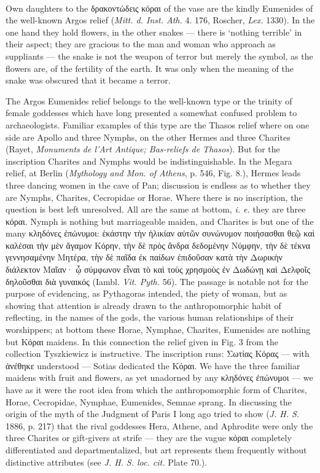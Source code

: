 \documentclass[a4paper, 11pt, oneside, polutonikogreek, english]{article}
\begin{document}
\paragraph{}
Own daughters to the δρακοντώδεις κόραι of the vase are the kindly Eumenides of the well-known Argos relief (\emph{Mitt. d. Inst. Ath.} 4. 176, Roscher, \emph{Lex.} 1330). In the one hand they hold flowers, in the other snakes --- there is `nothing terrible' in their aspect; they are gracious to the man and woman who approach as suppliants --- the snake is not the weapon of terror but merely the symbol, as the flowers are, of the fertility of the earth. It was only when the meaning of the snake was obscured that it became a terror.

The Argos Eumenides relief belongs to the well-known type or the trinity of female goddesses which have long presented a somewhat confused problem to archaeologists. Familiar examples of this type are the Thasos relief where on one side are Apollo and three Nymphs, on the other Hermes and three Charites (Rayet, \emph{Monuments de l'Art Antique; Bas-reliefs de Thasos}). But for the inscription Charites and Nymphs would be indistinguishable. In the Megara relief, at Berlin (\emph{Mythology and Mon. of Athens}, p. 546, Fig. 8.), Hermes leads three dancing women in the cave of Pan; discussion is endless as to whether they are Nymphs, Charites, Cecropidae or Horae. Where there is no inscription, the question is best left unresolved. All are the same at bottom, \emph{i. e.} they are three κόραι. Nymph is nothing but marriageable maiden, and Charites is but one of the many κληδόνες ἐπώνυμοι: ἑκάστην τὴν ἡλικίαν αὐτῶν συνώνυμον ποιήσασθαι θεῷ καὶ καλέσαι τὴν μὲν ἄγαμον Κόρην, τὴν δὲ πρὸς ἄνδρα δεδομένην Νύμφην, τὴν δὲ τέκνα γεννησαμένην Μητέρα, τὴν δὲ παῖδα ἐκ παίδων ἐπιδοῦσαν κατὰ τὴν Δωρικὴν διάλεκτον Μαῖαν· ᾧ σύμφωνον εἶναι τὸ καὶ τοὺς χρησμοὺς ἐν Δωδώνῃ καὶ Δελφοῖς δηλοῦσθαι διὰ γυναικός (Iambl. \emph{Vit. Pyth.} 56). The passage is notable not for the purpose of evidencing, as Pythagoras intended, the piety of woman, but as showing that attention is already drawn to the anthropomorphic habit of reflecting, in the names of the gods, the various human relationships of their worshippers; at bottom these Horae, Nymphae, Charites, Eumenides are nothing but Κόραι maidens. In this connection the relief given in Fig. 3 from the collection Tyszkiewicz is instructive. The inscription runs: Σωτίας Κόρας --- with ἀνέθηκε understood --- Sotias dedicated the Κόραι. We have the three familiar maidens with fruit and flowers, as yet unadorned by any κληδόνες ἐπώνυμοι --- we have as it were the root idea from which the anthropomorphic form of Charites, Horae, Cecropidae, Nymphae, Eumenides, Semnae sprang. In discussing the origin of the myth of the Judgment of Paris I long ago tried to show (\emph{J. H. S.} 1886, p. 217) that the rival goddesses Hera, Athene, and Aphrodite were only the three Charites or gift-givers at strife --- they are the vague κόραι completely differentiated and departmentalized, but art represents them frequently without distinctive attributes (see \emph{J. H. S. loc. cit.} Plate 70.).
\end{document}
